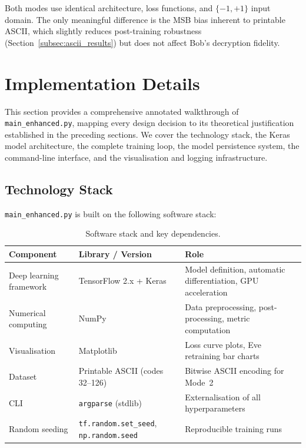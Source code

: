 \documentclass[12pt, a4paper]{article}
\newcommand{\code}[1]{\texttt{\color{CodeRed}#1}}
\begin{document}
Both modes use identical architecture, loss functions, and $\{-1,+1\}$
input domain. The only meaningful difference is the MSB bias inherent
to printable ASCII, which slightly reduces post-training robustness
(Section~\ref{subsec:ascii_results}) but does not affect Bob's decryption fidelity.
\newpage
\section{Implementation Details}
\label{sec:implementation}

This section provides a comprehensive annotated walkthrough of
\code{main\_enhanced.py}, mapping every design decision to its theoretical
justification established in the preceding sections. We cover the
technology stack, the Keras model architecture, the complete training loop,
the model persistence system, the command-line interface, and the
visualisation and logging infrastructure.

\subsection{Technology Stack}
\label{subsec:tech_stack}

\code{main\_enhanced.py} is built on the following software stack:

\begin{table}[H]
  \centering
  \caption{Software stack and key dependencies.}
  \label{tab:tech_stack}
  \renewcommand{\arraystretch}{1.35}
  \begin{tabularx}{\linewidth}{@{} l l X @{}}
    \toprule
    \textbf{Component} & \textbf{Library / Version} & \textbf{Role} \\
    \midrule
    Deep learning framework & TensorFlow 2.x + Keras &
      Model definition, automatic differentiation, GPU acceleration \\[3pt]
    Numerical computing & NumPy &
      Data preprocessing, post-processing, metric computation \\[3pt]
    Visualisation & Matplotlib &
      Loss curve plots, Eve retraining bar charts \\[3pt]
    Dataset & Printable ASCII (codes 32--126) &
      Bitwise ASCII encoding for Mode~2 \\[3pt]
    CLI & \code{argparse} (stdlib) &
      Externalisation of all hyperparameters \\[3pt]
    Random seeding & \code{tf.random.set\_seed},
      \code{np.random.seed} &
      Reproducible training runs \\
    \bottomrule
  \end{tabularx}
\end{table}
\end{document}
